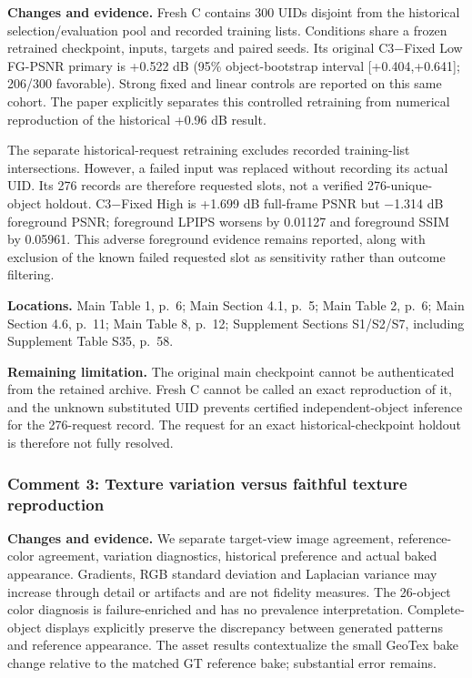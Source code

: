 \documentclass[
  10pt,
]{article}
\begin{document}
\textbf{Changes and evidence.} Fresh C contains 300 UIDs disjoint from
the historical selection/evaluation pool and recorded training lists.
Conditions share a frozen retrained checkpoint, inputs, targets and
paired seeds. Its original C3−Fixed Low FG-PSNR primary is +0.522 dB
(95\% object-bootstrap interval {[}+0.404,+0.641{]}; 206/300 favorable).
Strong fixed and linear controls are reported on this same cohort. The
paper explicitly separates this controlled retraining from numerical
reproduction of the historical +0.96 dB result.

The separate historical-request retraining excludes recorded
training-list intersections. However, a failed input was replaced
without recording its actual UID. Its 276 records are therefore
requested slots, not a verified 276-unique-object holdout. C3−Fixed High
is +1.699 dB full-frame PSNR but −1.314 dB foreground PSNR; foreground
LPIPS worsens by 0.01127 and foreground SSIM by 0.05961. This adverse
foreground evidence remains reported, along with exclusion of the known
failed requested slot as sensitivity rather than outcome filtering.

\textbf{Locations.} Main Table 1, p.~6; Main Section 4.1, p.~5; Main
Table 2, p.~6; Main Section 4.6, p.~11; Main Table 8, p.~12; Supplement
Sections S1/S2/S7, including Supplement Table S35, p.~58.

\textbf{Remaining limitation.} The original main checkpoint cannot be
authenticated from the retained archive. Fresh C cannot be called an
exact reproduction of it, and the unknown substituted UID prevents
certified independent-object inference for the 276-request record. The
request for an exact historical-checkpoint holdout is therefore not
fully resolved.

\hypertarget{comment-3-texture-variation-versus-faithful-texture-reproduction}{%
\subsubsection{Comment 3: Texture variation versus faithful texture
reproduction}\label{comment-3-texture-variation-versus-faithful-texture-reproduction}}

\textbf{Changes and evidence.} We separate target-view image agreement,
reference-color agreement, variation diagnostics, historical preference
and actual baked appearance. Gradients, RGB standard deviation and
Laplacian variance may increase through detail or artifacts and are not
fidelity measures. The 26-object color diagnosis is failure-enriched and
has no prevalence interpretation. Complete-object displays explicitly
preserve the discrepancy between generated patterns and reference
appearance. The asset results contextualize the small GeoTex bake change
relative to the matched GT reference bake; substantial error remains.
\end{document}
